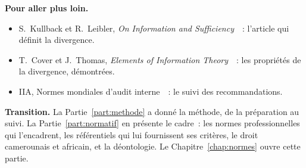 \begin{boxinfo}
\textbf{Pour aller plus loin.}
\begin{itemize}
    \item S.~Kullback et R.~Leibler, \textit{On Information and
          Sufficiency}~\cite{kullback1951}~: l'article qui définit la
          divergence.
    \item T.~Cover et J.~Thomas, \textit{Elements of Information
          Theory}~\cite{cover2006elements}~: les propriétés de la
          divergence, démontrées.
    \item IIA, Normes mondiales d'audit interne~\cite{iia2024gias}~: le
          suivi des recommandations.
\end{itemize}
\end{boxinfo}

\begin{boxinfo}
\textbf{Transition.} La Partie~\ref{part:methode} a donné la méthode, de la
préparation au suivi. La Partie~\ref{part:normatif} en présente le cadre~:
les normes professionnelles qui l'encadrent, les référentiels qui lui
fournissent ses critères, le droit camerounais et africain, et la
déontologie. Le Chapitre~\ref{chap:normes} ouvre cette partie.
\end{boxinfo}
